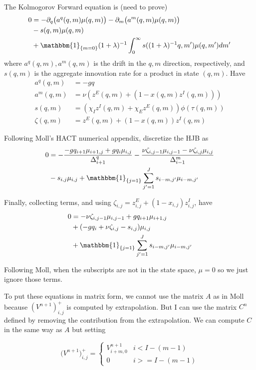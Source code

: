 \documentclass[12pt,english]{article}
\theoremstyle{remark}
\begin{document}
The Kolmogorov Forward equation is (need to prove)
\begin{align*}
0 &= - \partial_q \big(a^q (q,m) \mu (q,m) \big) - \partial_m \big( a^m (q,m) \mu (q,m) \big) \\
  & - s(q,m) \mu(q,m) \\
  &+ \mathbbm{1}_{\{m=0\}} (1+\lambda)^{-1}\int_0^{\infty} s((1+\lambda)^{-1}q,m') \mu(q,m') dm'  
\end{align*}
where $a^q(q,m),a^m(q,m)$ is the drift in the $q,m$ direction, respectively, and $s(q,m)$ is the aggregate innovation rate for a product in state $(q,m)$. Have 
\begin{align*}
a^q(q,m) &= -gq \\
a^m(q,m) &= \nu (z^E(q,m) + (1-x(q,m) z^I(q,m))) \\ 
s(q,m) &= (\chi_I z^I(q,m) + \chi_E z^E(q,m)) \phi (\tau(q,m)) \\ 
\zeta(q,m) &= z^E(q,m) + (1-x(q,m)) z^I(q,m) 
\end{align*}

Following Moll's HACT numerical appendix, discretize the HJB as
\begin{align*}
0 &= -\frac{-gq_{i+1} \mu_{i+1,j} + gq_i \mu_{i,j} }{\Delta^q_{i+1}}  -\frac{\nu \zeta_{i,j-1} \mu_{i,j-1} - \nu \zeta_{i,j} \mu_{i,j}}{\Delta^m_{i-1}}\\
  &  - s_{i,j} \mu_{i,j} + \mathbbm{1}_{\{j = 1\}} \sum_{j'=1}^J s_{i-m,j'} \mu_{i-m,j'}
\end{align*}

Finally, collecting terms, and using $\zeta_{i,j} = z^E_{i,j} + (1-x_{i,j}) z^I_{i,j}$, have 
\begin{align*}
0 &= -\nu \zeta_{i,j-1} \mu_{i,j-1}  + gq_{i+1} \mu_{i+1,j} \\
& + (-gq_i + \nu  \zeta_{i,j} - s_{i,j}) \mu_{i,j} \\
& + \mathbbm{1}_{\{j=1\}} \sum_{j'=1}^J s_{i-m,j'} \mu_{i-m,j'}
\end{align*}

Following Moll, when the subscripts are not in the state space, $\mu = 0$ so we just ignore those terms.

To put these equations in matrix form, we cannot use the matrix $A$ as in Moll because $(V^{n+1})^+_{i,j}$ is computed by extrapolation. But I can use the matrix $C^n$ defined by removing the contribution from the extrapolation. We can compute $C$ in the same way as $A$ but setting 

\[ \big(V^{n+1}\big)^+_{i,j} = \begin{cases} 
V^{n+1}_{i+m,0} & i < I - (m-1) \\
0 & i >= I-(m-1) 
\end{cases}
\]
\end{document}
